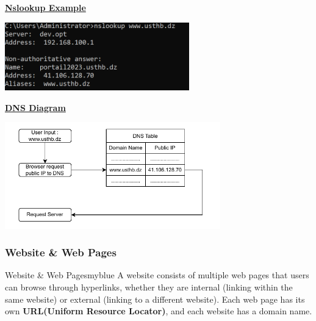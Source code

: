 \newpage
\null
\textbf{\underline{Nslookup Example}}
\vspace{0.25cm}
\begin{center}
    \includegraphics[width=0.6\textwidth]{Chapters/Diagram/Intro/usthbIP.PNG}
\end{center}


\vspace{1.75cm}

\textbf{\underline{DNS Diagram}}
\begin{center}
    \includegraphics[width=0.7\textwidth]{Chapters/Diagram/Intro/web0.1.drawio.pdf}
\end{center}

\newpage

\subsubsection{Website \& Web Pages}
\begin{prettyBox}{Website \& Web Pages}{myblue}
A website consists of multiple web pages that users can browse through hyperlinks,  
whether they are internal (linking within the same website) or external (linking to a different
website). Each web page has its own \textbf{URL(Uniform Resource Locator)}, and each website has a domain name.
\end{prettyBox}

\vspace{1cm}

